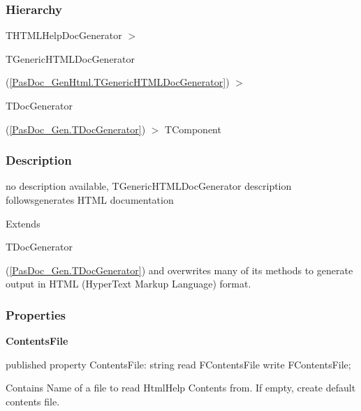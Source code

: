 \documentclass{report}
\newif\ifpdf
\begin{document}
\subsubsection*{\large{\textbf{Hierarchy}}\normalsize\hspace{1ex}\hfill}
THTMLHelpDocGenerator {$>$} \begin{ttfamily}TGenericHTMLDocGenerator\end{ttfamily}(\ref{PasDoc_GenHtml.TGenericHTMLDocGenerator}) {$>$} \begin{ttfamily}TDocGenerator\end{ttfamily}(\ref{PasDoc_Gen.TDocGenerator}) {$>$} 
TComponent
\subsubsection*{\large{\textbf{Description}}\normalsize\hspace{1ex}\hfill}
no description available, TGenericHTMLDocGenerator description followsgenerates HTML documentation\hfill\vspace*{1ex}

 Extends \begin{ttfamily}TDocGenerator\end{ttfamily}(\ref{PasDoc_Gen.TDocGenerator}) and overwrites many of its methods to generate output in HTML (HyperText Markup Language) format.\subsubsection*{\large{\textbf{Properties}}\normalsize\hspace{1ex}\hfill}
\begin{list}{}{
\setlength{\itemindent}{0cm}
\setlength{\listparindent}{0cm}
\setlength{\leftmargin}{\evensidemargin}
\addtolength{\leftmargin}{\tmplength}
\settowidth{\labelsep}{X}
\addtolength{\leftmargin}{\labelsep}
\setlength{\labelwidth}{\tmplength}
}
\label{PasDoc_GenHtmlHelp.THTMLHelpDocGenerator-ContentsFile}
\item[\textbf{ContentsFile}\hfill]
\ifpdf
\begin{flushleft}
\fi
\begin{ttfamily}
published property ContentsFile: string read FContentsFile write FContentsFile;\end{ttfamily}

\ifpdf
\end{flushleft}
\fi


\par Contains Name of a file to read HtmlHelp Contents from. If empty, create default contents file.\end{list}
\end{document}
